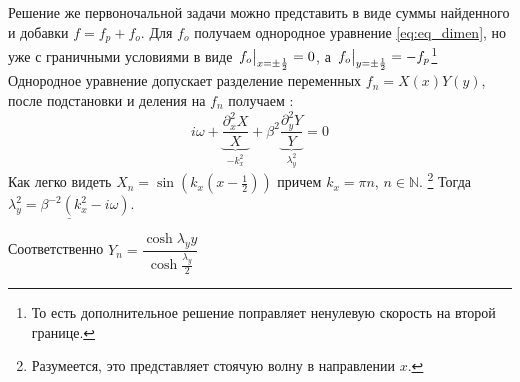 \documentclass[a4paper,12pt]{article}
\theoremstyle{plain} %
\theoremstyle{definition} %
\theoremstyle{remark} %
\begin{document}
Решение же первоночальной задачи можно представить в виде суммы найденного и добавки $f = f_p + f_o$.
Для $f_o $ получаем однородное уравнение \eqref{eq:eq_dimen}, но уже с граничными условиями в виде $\eval{f_o}_{x=\pm \frac{1}{2}}=0$, а $\eval{f_o} _{y=\pm\frac{1}{2}} = -f_p$\footnote{То есть дополнительное решение поправляет ненулевую скорость на второй границе.}
Однородное уравнение допускает разделение переменных $f_n = X(x)Y(y)$, после подстановки и деления на $f_n$ получаем :
\begin{equation}
    i\omega + \underbrace{\frac{\partial_x^2 X}{X}}_{-k_x^2} +\beta^2 \underbrace{\frac{\partial_y^2 Y}{Y}}_{\lambda_y^2}=0
\end{equation}
Как легко видеть $X_n = \sin(k_x (x-\frac{1}{2}))$ причем $k_x = \pi n$, $n\in \mathbb{N}$. \footnote{Разумеется, это представляет стоячую волну в направлении $x$.}
Тогда $\underline{\lambda_y^2 = \beta^{-2}(k_x^2 - i\omega)}$.

Соответственно $Y_n = \dfrac{\cosh{\lambda_y y}}{\cosh{\frac{\lambda_y}{2}}}$
\end{document}

